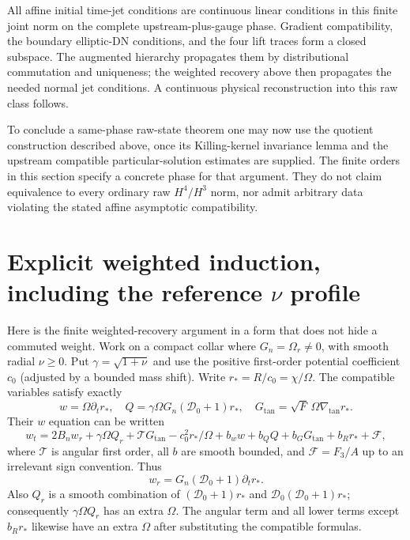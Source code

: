 \documentclass[11pt]{article}
\begin{document}
All affine initial time-jet conditions are continuous linear conditions in this finite joint norm on the complete upstream-plus-gauge phase. Gradient compatibility, the boundary elliptic-DN conditions, and the four lift traces form a closed subspace. The augmented hierarchy propagates them by distributional commutation and uniqueness; the weighted recovery above then propagates the needed normal jet conditions. A continuous physical reconstruction into this raw class follows.

To conclude a same-phase raw-state theorem one may now use the quotient construction described above, once its Killing-kernel invariance lemma and the upstream compatible particular-solution estimates are supplied. The finite orders in this section specify a concrete phase for that argument. They do not claim equivalence to every ordinary raw $H^4/H^3$ norm, nor admit arbitrary data violating the stated affine asymptotic compatibility.
\section{Explicit weighted induction, including the reference $\nu$ profile}
Here is the finite weighted-recovery argument in a form that does not hide a commuted weight. Work on a compact collar where $G_n=\Omega_r\ne0$, with smooth radial $\nu\ge0$. Put $\gamma=\sqrt{1+\nu}$ and use the positive first-order potential coefficient $c_0$ (adjusted by a bounded mass shift). Write $r_*=R/c_0=\chi/\Omega$. The compatible variables satisfy exactly
\[
 w=\Omega\partial_t r_*,\quad
 Q=\gamma\Omega G_n(\mathcal D_0+1)r_*,\quad
 G_{\tan}=\sqrt F\,\Omega\nabla_{\tan}r_*.
\]
Their $w$ equation can be written
\begin{equation}
 w_t=2B_n w_r+\gamma\Omega Q_r+
 \mathcal T G_{\tan}-c_0^2 r_*/\Omega+
 b_w w+b_QQ+b_GG_{\tan}+b_Rr_*+\mathcal F,\label{weightw}
\end{equation}
where $\mathcal T$ is angular first order, all $b$ are smooth bounded, and $\mathcal F=F_3/A$ up to an irrelevant sign convention. Thus
\[
 w_r=G_n(\mathcal D_0+1)\partial_t r_*.
\]
Also $Q_r$ is a smooth combination of $(\mathcal D_0+1)r_*$ and $\mathcal D_0(\mathcal D_0+1)r_*$; consequently $\gamma\Omega Q_r$ has an extra $\Omega$. The angular term and all lower terms except $b_Rr_*$ likewise have an extra $\Omega$ after substituting the compatible formulas.
\end{document}
